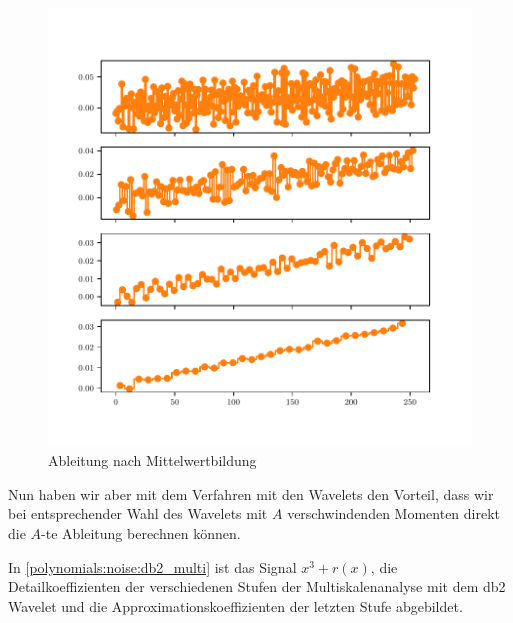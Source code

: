 \begin{refsection}
\begin{figure}
    \centering
    \includegraphics{papers/polynomials/images/polynomials_noise_moving_average.pdf}
    \caption{Ableitung nach Mittelwertbildung\label{polynomials:noise:average}}
\end{figure}

Nun haben wir aber mit dem Verfahren mit den Wavelets den Vorteil, dass wir bei
entsprechender Wahl des Wavelets mit $A$ verschwindenden Momenten direkt die
$A$-te Ableitung berechnen können.

In \autoref{polynomials:noise:db2_multi} ist das Signal $x^3 + r(x)$, die
Detailkoeffizienten der verschiedenen Stufen der Multiskalenanalyse mit dem db2
Wavelet und die Approximationskoeffizienten der letzten Stufe abgebildet.


\end{refsection}
